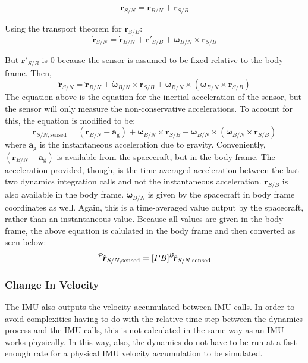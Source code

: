 \begin{equation}
\bm{r}_{S/N} = \bm{r}_{B/N} + \bm{r}_{S/B}
\end{equation}

Using the transport theorem for $\dot{\bm{r}}_{S/B}$:
\begin{equation}
	\dot{\bm{r}}_{S/N} = \dot{\bm{r}}_{B/N} + \bm{r}'_{S/B} + \bm{\omega}_{B/N} \times \bm{r}_{S/B}
	\label{eq:rDot}
\end{equation}

But $\bm{r}'_{S/B}$ is $0$ because the sensor is assumed to be fixed relative to the body frame. Then,
\begin{equation}
\ddot{\bm{r}}_{S/N} = \ddot{\bm{r}}_{B/N} + \dot{\bm{\omega}}_{B/N} \times \bm{r}_{S/B} +  \bm{\omega}_{B/N} \times (\bm{\omega}_{B/N} \times \bm{r}_{S/B})
\end{equation}
The equation above is the equation for the inertial acceleration of the sensor, but the sensor will only measure the non-conservative accelerations. To account for this, the equation is modified to be:
\begin{equation}
\ddot{\bm{r}}_{S/N, \textrm{sensed}} = (\ddot{\bm{r}}_{B/N} - \bm{a}_\textrm{g}) + \dot{\bm{\omega}}_{B/N} \times \bm{r}_{S/B} +  \bm{\omega}_{B/N} \times (\bm{\omega}_{B/N} \times \bm{r}_{S/B})
\end{equation}
where $\bm{a}_\textrm{g}$ is the instantaneous acceleration due to gravity. Conveniently, $(\ddot{\bm{r}}_{B/N} - \bm{a}_\textrm{g})$ is available from the spacecraft, but in the body frame. The acceleration provided, though, is the time-averaged acceleration between the last two dynamics integration calls and not the instantaneous acceleration. $\bm{r}_{S/B}$ is also available in the body frame. $\dot{\bm{\omega}}_{B/N}$ is given by the spacecraft in body frame coordinates as well. Again, this is a time-averaged value output by the spacecraft, rather than an instantaneous value. Because all values are given in the body frame, the above equation is calulated in the body frame and then converted as seen below:
\begin{equation}
	\leftexp{P}{\ddot{\bm{r}}_{S/N, \textrm{sensed}}} = [PB] \leftexp{B}{ \ddot{\bm{r}}_{S/N, \textrm{sensed}}}
\end{equation}

\subsubsection{Change In Velocity}
The IMU also outputs the velocity accumulated between IMU calls. In order to avoid complexities having to do with the relative time step between the dynamics process and the IMU calls, this is not calculated in the same way as an IMU works physically. In this way, also, the dynamics do not have to be run at a fast enough rate for a physical IMU velocity accumulation to be simulated.

